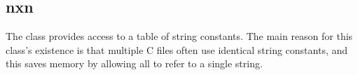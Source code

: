 %
%
%
%
%              

\subsection{nxn}
\label{nxn}

The  class provides access to a table of string constants.  The
main reason for this class's existence is that multiple C files often use
identical string constants, and this saves memory by allowing all to refer to a
single string.


